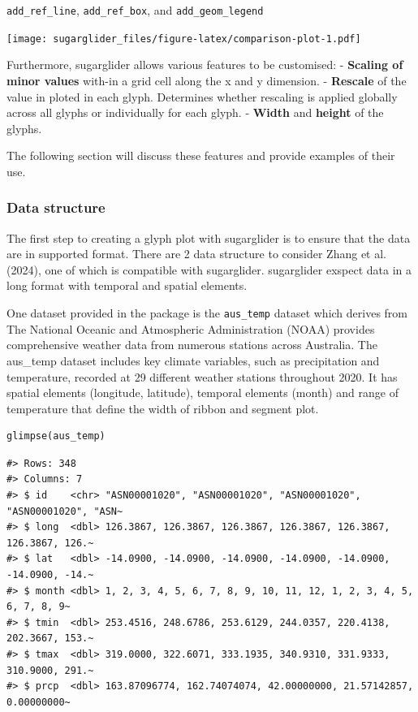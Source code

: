 \texttt{add\_ref\_line}, \texttt{add\_ref\_box}, and \texttt{add\_geom\_legend}

\texttt{[image: sugarglider\_files/figure-latex/comparison-plot-1.pdf]}

Furthermore, sugarglider allows various features to be customised:
- \textbf{Scaling of minor values} with-in a grid cell along the x and y dimension.
- \textbf{Rescale} of the value in ploted in each glyph. Determines whether rescaling is applied globally across all glyphs or individually for each glyph.
- \textbf{Width} and \textbf{height} of the glyphs.

The following section will discuss these features and provide examples of their use.

\hypertarget{data-structure}{%
\subsubsection{Data structure}\label{data-structure}}

The first step to creating a glyph plot with sugarglider is to ensure that the data are in supported format. There are 2 data structure to consider Zhang et al. (2024), one of which is compatible with sugarglider. sugarglider exspect data in a long format with temporal and spatial elements.

One dataset provided in the package is the \texttt{aus\_temp} dataset which derives from The National Oceanic and Atmospheric Administration (NOAA) provides comprehensive weather data from numerous stations across Australia. The aus\_temp dataset includes key climate variables, such as precipitation and temperature, recorded at 29 different weather stations throughout 2020. It has spatial elements (longitude, latitude), temporal elements (month) and range of temperature that define the width of ribbon and segment plot.

\begin{verbatim}
glimpse(aus_temp)
\end{verbatim}

\begin{verbatim}
#> Rows: 348
#> Columns: 7
#> $ id    <chr> "ASN00001020", "ASN00001020", "ASN00001020", "ASN00001020", "ASN~
#> $ long  <dbl> 126.3867, 126.3867, 126.3867, 126.3867, 126.3867, 126.3867, 126.~
#> $ lat   <dbl> -14.0900, -14.0900, -14.0900, -14.0900, -14.0900, -14.0900, -14.~
#> $ month <dbl> 1, 2, 3, 4, 5, 6, 7, 8, 9, 10, 11, 12, 1, 2, 3, 4, 5, 6, 7, 8, 9~
#> $ tmin  <dbl> 253.4516, 248.6786, 253.6129, 244.0357, 220.4138, 202.3667, 153.~
#> $ tmax  <dbl> 319.0000, 322.6071, 333.1935, 340.9310, 331.9333, 310.9000, 291.~
#> $ prcp  <dbl> 163.87096774, 162.74074074, 42.00000000, 21.57142857, 0.00000000~
\end{verbatim}

